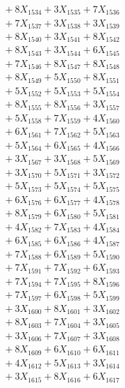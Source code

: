 \documentclass[a4paper,10pt]{article}
\begin{document}
{\begin{align}
&\;  + 8 X_{1534} + 3 X_{1535} + 7 X_{1536} \\[0.3ex]
&\;  + 7 X_{1537} + 3 X_{1538} + 3 X_{1539} \\[0.5ex]\allowbreak
&\;  + 8 X_{1540} + 3 X_{1541} + 8 X_{1542} \\[0.3ex]
&\;  + 8 X_{1543} + 3 X_{1544} + 6 X_{1545} \\[0.3ex]
&\;  + 7 X_{1546} + 8 X_{1547} + 8 X_{1548} \\[0.3ex]
&\;  + 8 X_{1549} + 5 X_{1550} + 8 X_{1551} \\[0.3ex]
&\;  + 5 X_{1552} + 5 X_{1553} + 5 X_{1554} \\[0.3ex]
&\;  + 8 X_{1555} + 8 X_{1556} + 3 X_{1557} \\[0.3ex]
&\;  + 5 X_{1558} + 7 X_{1559} + 4 X_{1560} \\[0.3ex]
&\;  + 6 X_{1561} + 7 X_{1562} + 5 X_{1563} \\[0.3ex]
&\;  + 5 X_{1564} + 6 X_{1565} + 4 X_{1566} \\[0.3ex]
&\;  + 3 X_{1567} + 3 X_{1568} + 5 X_{1569} \\[0.5ex]\allowbreak
&\;  + 3 X_{1570} + 5 X_{1571} + 3 X_{1572} \\[0.3ex]
&\;  + 5 X_{1573} + 5 X_{1574} + 5 X_{1575} \\[0.3ex]
&\;  + 6 X_{1576} + 6 X_{1577} + 4 X_{1578} \\[0.3ex]
&\;  + 8 X_{1579} + 6 X_{1580} + 5 X_{1581} \\[0.3ex]
&\;  + 4 X_{1582} + 7 X_{1583} + 4 X_{1584} \\[0.3ex]
&\;  + 6 X_{1585} + 6 X_{1586} + 4 X_{1587} \\[0.3ex]
&\;  + 7 X_{1588} + 6 X_{1589} + 5 X_{1590} \\[0.3ex]
&\;  + 7 X_{1591} + 7 X_{1592} + 6 X_{1593} \\[0.3ex]
&\;  + 7 X_{1594} + 7 X_{1595} + 8 X_{1596} \\[0.3ex]
&\;  + 7 X_{1597} + 6 X_{1598} + 5 X_{1599} \\[0.5ex]\allowbreak
&\;  + 3 X_{1600} + 8 X_{1601} + 3 X_{1602} \\[0.3ex]
&\;  + 8 X_{1603} + 7 X_{1604} + 3 X_{1605} \\[0.3ex]
&\;  + 3 X_{1606} + 7 X_{1607} + 3 X_{1608} \\[0.3ex]
&\;  + 8 X_{1609} + 6 X_{1610} + 6 X_{1611} \\[0.3ex]
&\;  + 4 X_{1612} + 5 X_{1613} + 3 X_{1614} \\[0.3ex]
&\;  + 3 X_{1615} + 8 X_{1616} + 6 X_{1617} \\[0.3ex]

\end{align}}
\end{document}
